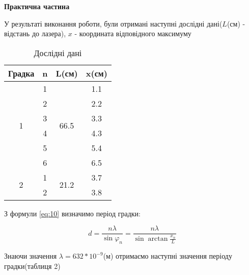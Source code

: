 \begin{center}
    \Large{\textbf{Практична частина}}
\end{center}

\vspace{1mm}

У результаті виконання роботи, були отримані наступні дослідні дані($L$(см) - відстань до лазера),
$x$ - координата відповідного максимуму

\begin{table}[h!]
    \centering
    \begin{tabular}{|c|c|c|c|}
        \hline
        \textbf{Градка} & \textbf{n} & \textbf{L(см)} & \textbf{x(см)} \\        
        \hline
        \multirow{6}{*}{1} & 1 & \multirow{6}{*}{66.5} & 1.1 \\
        \cline{2-2} \cline{4-4}
         & 2 &  & 2.2 \\
        \cline{2-2} \cline{4-4}
         & 3 &  & 3.3 \\
        \cline{2-2} \cline{4-4}
        & 4 &  & 4.3 \\
        \cline{2-2} \cline{4-4}
        & 5 &  & 5.4 \\
        \cline{2-2} \cline{4-4}
        & 6 &  & 6.5 \\
        \hline

        
        \multirow{2}{*}{2} & 1 & \multirow{2}{*}{21.2} & 3.7 \\        
        \cline{2-2} \cline{4-4}
        & 2 &  & 3.8 \\
        \hline
    \end{tabular}

    \caption{Дослідні дані}
\end{table}

З формули \ref{eq:10} визначимо період градки:

$$ d = \frac{n \lambda}{\sin{\varphi_n}} = \frac{n \lambda}{\sin{\arctan{\frac{x_n}{L}}}} $$

Знаючи значення $\lambda = 632*10^{-9}$(м) отримаємо наступні значення \; періоду 
градки(таблиця 2)

